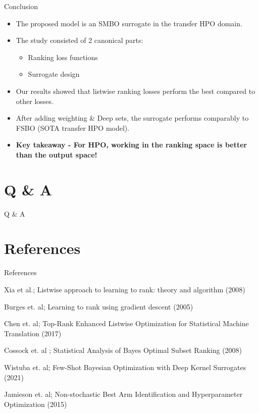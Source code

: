 \documentclass{beamer}
\begin{document}
\begin{frame}[t]{Conclusion}
\begin{itemize}
\item The proposed model is an SMBO surrogate in the transfer HPO domain.
\item The study consisted of 2 canonical parts:
\begin{itemize}
\item Ranking loss functions
\item Surrogate design
\end{itemize}
\item Our results showed that listwise ranking losses perform the best compared to other losses.
\item After adding weighting \& Deep sets,  the surrogate performs comparably to FSBO (SOTA transfer HPO model).
\item \textbf{Key takeaway - For HPO,  working in the ranking space is better than the output space!}
\end{itemize}
\end{frame}

\section{Q \& A}

\begin{frame}
\centering
\LARGE{Q \& A}
\end{frame}

\section{References}

\begin{frame}[t]{References}

\begin{thebibliography}{1}

\alert{Xia et al.; Listwise approach to learning to rank: theory and algorithm (2008)}

\alert{Burges et.  al; Learning to rank using gradient descent (2005)}

\alert{Chen et.  al; Top-Rank Enhanced Listwise Optimization for Statistical Machine Translation (2017)}

\alert{Cossock et. al ; Statistical Analysis of Bayes Optimal Subset Ranking (2008)}

\alert{Wistuba et.  al; Few-Shot Bayesian Optimization with Deep Kernel Surrogates (2021)}

\alert{Jamieson et.  al;  Non-stochastic Best Arm Identification and Hyperparameter Optimization (2015)}

\end{thebibliography}

\end{frame}
\end{document}
